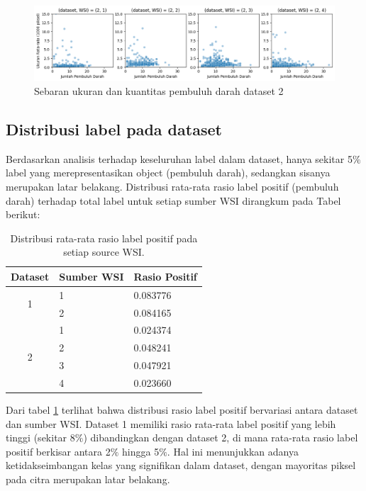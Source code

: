 \begin{figure}[h]
	\centering
	\includegraphics[width=\textwidth]{gambar/bab4/sct_2.png}
	\caption{Sebaran ukuran dan kuantitas pembuluh darah dataset 2}
	\label{fig:sct_2}
\end{figure}


\subsection{Distribusi label pada dataset}
\noindent Berdasarkan analisis terhadap keseluruhan label dalam dataset, hanya sekitar 5$\%$ label yang merepresentasikan object (pembuluh darah), sedangkan sisanya merupakan latar belakang. Distribusi rata-rata rasio label positif (pembuluh darah) terhadap total label untuk setiap sumber WSI dirangkum pada Tabel berikut:


\begin{table}[H]
	\centering
	\caption{Distribusi rata-rata rasio label positif pada setiap source WSI.}
	\label{tab:distribusi_label}
	\begin{tabular}{cll}
		\hline
		\multicolumn{1}{l}{Dataset} & Sumber WSI & Rasio Positif \\ \hline
		\multirow{2}{*}{1}          & 1          & 0.083776      \\
		& 2          & 0.084165       \\ \hline
		\multirow{4}{*}{2}          & 1          & 0.024374       \\
		& 2          & 0.048241       \\
		& 3          & 0.047921       \\
		& 4          & 0.023660       \\ \hline
	\end{tabular}
\end{table}

\noindent Dari tabel \ref{tab:distribusi_label} terlihat bahwa distribusi rasio label positif bervariasi antara dataset dan sumber WSI. Dataset 1 memiliki rasio rata-rata label positif yang lebih tinggi (sekitar 8$\%$) dibandingkan dengan dataset 2, di mana rata-rata rasio label positif berkisar antara 2$\%$ hingga 5$\%$. Hal ini menunjukkan adanya ketidakseimbangan kelas yang signifikan dalam dataset, dengan mayoritas piksel pada citra merupakan latar belakang.


